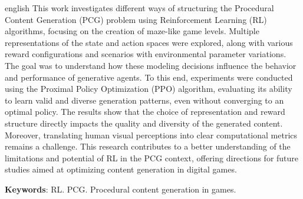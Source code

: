 \begin{otherlanguage*}{english}
    This work investigates different ways of structuring the Procedural 
    Content Generation (PCG) problem using Reinforcement Learning (RL) 
    algorithms, focusing on the creation of maze-like game levels. Multiple 
    representations of the state and action spaces were explored, along 
    with various reward configurations and scenarios with environmental 
    parameter variations. The goal was to understand how these modeling 
    decisions influence the behavior and performance of generative agents. 
    To this end, experiments were conducted using the Proximal Policy Optimization 
    (PPO) algorithm, evaluating its ability to learn valid and diverse generation 
    patterns, even without converging to an optimal policy. The results show that 
    the choice of representation and reward structure directly impacts the quality 
    and diversity of the generated content. Moreover, translating human visual 
    perceptions into clear computational metrics remains a challenge. This 
    research contributes to a better understanding of the limitations and 
    potential of RL in the PCG context, offering directions for future studies 
    aimed at optimizing content generation in digital games.
    
    \textbf{Keywords}: RL. PCG. Procedural content generation in games.
\end{otherlanguage*}
\newpage
